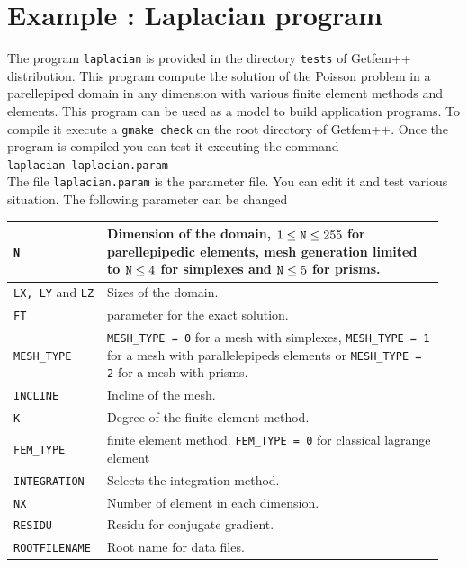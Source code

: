 \documentclass[11pt,a4paper]{article}
\begin{document}
\section{Example : Laplacian program}

The program {\tt laplacian} is provided in the directory {\tt tests} of {\sc Getfem++} distribution. This program compute the solution of the Poisson problem in a parellepiped domain in any dimension with various finite element methods and elements. This program can be used as a model to build application programs. To compile it execute a {\tt gmake check} on the root directory of {\sc Getfem++}. Once the program is compiled you can test it executing the command\\[0.5cm]
{\tt laplacian laplacian.param}\\[0.5cm]
The file {\tt laplacian.param} is the parameter file. You can edit it and test various situation. The following parameter can be changed\\[0.5cm]
\begin{center} \begin{tabular}{|m{0.2\linewidth}|m{0.75\linewidth}|} \hline

  {\tt N} & Dimension of the domain, $1 \leq {\tt N} \leq 255$ for parellepipedic elements, mesh generation limited to ${\tt N} \leq 4$ for simplexes and ${\tt N} \leq 5$ for prisms.  \\ \hline

  {\tt LX, LY} and {\tt LZ} &  Sizes of the domain. \\ \hline

  {\tt FT} &  parameter for the exact solution. \\ \hline

  {\tt MESH\_TYPE} &  {\tt MESH\_TYPE = 0} for a mesh with simplexes,   {\tt MESH\_TYPE = 1} for a mesh with parallelepipeds elements or {\tt MESH\_TYPE = 2} for a mesh with prisms. \\ \hline

  {\tt INCLINE} &  Incline of the mesh.\\ \hline

  {\tt K} &  Degree of the finite element method. \\ \hline

  {\tt FEM\_TYPE} &  finite element method.  {\tt FEM\_TYPE = 0} for classical lagrange element\\ \hline

  {\tt INTEGRATION} & Selects the integration method.  \\ \hline

  {\tt NX} &  Number of element in each dimension. \\ \hline

  {\tt RESIDU} & Residu for conjugate gradient. \\ \hline

  {\tt ROOTFILENAME} & Root name for data files. \\ \hline

\end{tabular} \end{center}
\end{document}
